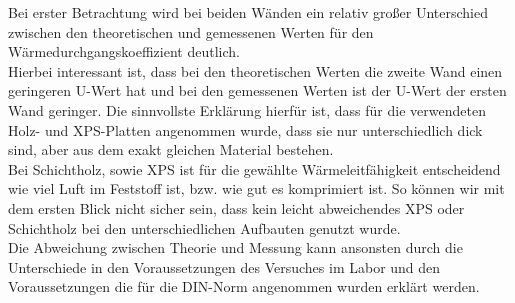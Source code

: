 Bei erster Betrachtung wird bei beiden Wänden ein relativ großer Unterschied zwischen den theoretischen und gemessenen Werten für den Wärmedurchgangskoeffizient deutlich.\\
Hierbei interessant ist, dass bei den theoretischen Werten die zweite Wand einen geringeren U-Wert hat und bei den gemessenen Werten ist der U-Wert der ersten Wand geringer.
Die sinnvollste Erklärung hierfür ist, dass für die verwendeten Holz- und XPS-Platten angenommen wurde, dass sie nur unterschiedlich dick sind, aber aus dem exakt gleichen Material bestehen.\\
Bei Schichtholz, sowie XPS ist für die gewählte Wärmeleitfähigkeit entscheidend wie viel Luft im Feststoff ist, bzw. wie gut es komprimiert ist.
So können wir mit dem ersten Blick nicht sicher sein, dass kein leicht abweichendes XPS oder Schichtholz bei den unterschiedlichen Aufbauten genutzt wurde.\\
Die Abweichung zwischen Theorie und Messung kann ansonsten durch die Unterschiede in den Voraussetzungen des Versuches im Labor und den Voraussetzungen die für die DIN-Norm angenommen wurden erklärt werden.